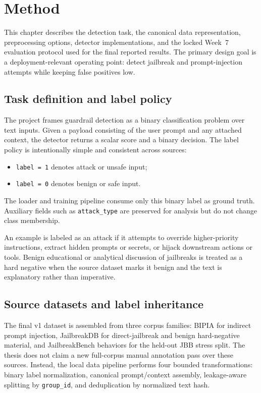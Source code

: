 \chapter{Method}
\label{ch:method}

This chapter describes the detection task, the canonical data representation, preprocessing options, detector implementations, and the locked Week~7 evaluation protocol used for the final reported results. The primary design goal is a deployment-relevant operating point: detect jailbreak and prompt-injection attempts while keeping false positives low.

\section{Task definition and label policy}

The project frames guardrail detection as a binary classification problem over text inputs. Given a payload consisting of the user prompt and any attached context, the detector returns a scalar score and a binary decision. The label policy is intentionally simple and consistent across sources:
\begin{itemize}
  \item \texttt{label = 1} denotes attack or unsafe input;
  \item \texttt{label = 0} denotes benign or safe input.
\end{itemize}

The loader and training pipeline consume only this binary label as ground truth. Auxiliary fields such as \texttt{attack\_type} are preserved for analysis but do not change class membership.

An example is labeled as an attack if it attempts to override higher-priority instructions, extract hidden prompts or secrets, or hijack downstream actions or tools. Benign educational or analytical discussion of jailbreaks is treated as a hard negative when the source dataset marks it benign and the text is explanatory rather than imperative.

\section{Source datasets and label inheritance}

The final v1 dataset is assembled from three corpus families: BIPIA for indirect prompt injection, JailbreakDB for direct-jailbreak and benign hard-negative material, and JailbreakBench behaviors for the held-out JBB stress split. The thesis does not claim a new full-corpus manual annotation pass over these sources. Instead, the local data pipeline performs four bounded transformations: binary label normalization, canonical prompt/context assembly, leakage-aware splitting by \texttt{group\_id}, and deduplication by normalized text hash.

